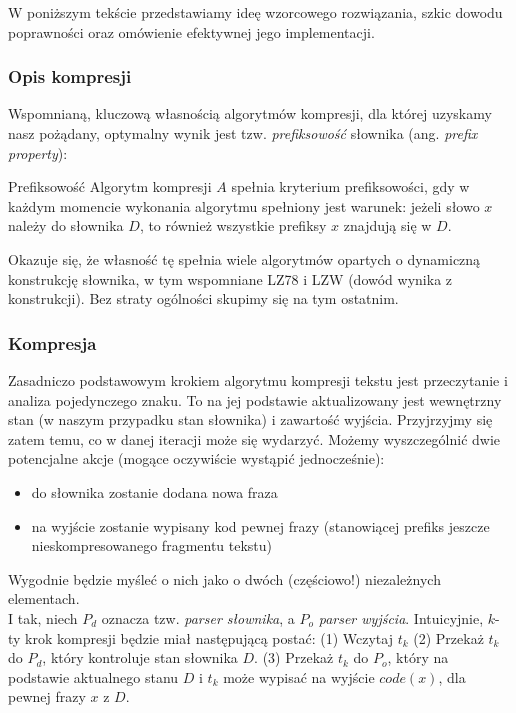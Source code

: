 W poniższym tekście przedstawiamy ideę wzorcowego rozwiązania, szkic dowodu poprawności oraz omówienie efektywnej jego implementacji.

\subsubsection{Opis kompresji}
Wspomnianą, kluczową własnością algorytmów kompresji, dla której uzyskamy nasz pożądany, optymalny wynik jest tzw. \textit{prefiksowość} słownika (ang. \textit{prefix property}):

\begin{definition}{}{Prefiksowość}
Algorytm kompresji $A$ spełnia kryterium prefiksowości, gdy w każdym momencie wykonania algorytmu spełniony jest warunek: jeżeli słowo $x$ należy do słownika $D$, to również wszystkie prefiksy $x$ znajdują się w $D$.
\end{definition}

Okazuje się, że własność tę spełnia wiele algorytmów opartych o dynamiczną konstrukcję słownika, w tym wspomniane LZ78 i LZW (dowód wynika z konstrukcji). Bez straty ogólności skupimy się na tym ostatnim.

\subsubsection{Kompresja}

Zasadniczo podstawowym krokiem algorytmu kompresji tekstu jest przeczytanie i analiza pojedynczego znaku. To na jej podstawie aktualizowany jest wewnętrzny stan (w naszym przypadku stan słownika) i zawartość wyjścia. Przyjrzyjmy się zatem temu, co w danej iteracji może się wydarzyć. Możemy wyszczególnić dwie potencjalne akcje (mogące oczywiście wystąpić jednocześnie):
\begin{itemize}
    \item do słownika zostanie dodana nowa fraza
    \item na wyjście zostanie wypisany kod pewnej frazy (stanowiącej prefiks jeszcze nieskompresowanego fragmentu tekstu)
\end{itemize}

Wygodnie będzie myśleć o nich jako o dwóch (częściowo!) niezależnych elementach.\\
I tak, niech $P_{d}$ oznacza tzw. \textit{parser słownika}, a $P_{o}$ \textit{parser wyjścia}.
Intuicyjnie, $k$-ty krok kompresji będzie miał następującą postać:
(1) Wczytaj $t_{k}$
(2) Przekaż $t_{k}$ do $P_{d}$, który kontroluje stan słownika $D$.
(3) Przekaż $t_{k}$ do $P_{o}$, który na podstawie aktualnego stanu $D$ i $t_{k}$ może wypisać na wyjście $code(x)$, dla pewnej frazy $x$ z $D$.


